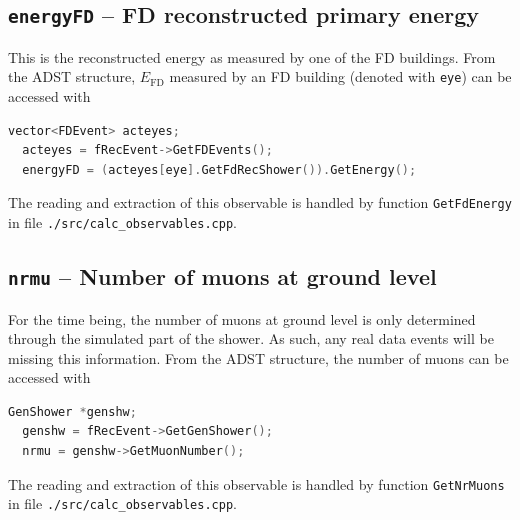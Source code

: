 \documentclass[12pt,a4paper]{report}
\begin{document}
\subsection{\texttt{energyFD} -- FD reconstructed primary energy}
This is the reconstructed energy as measured by one of the FD buildings. From the ADST structure, $E_{\textrm{FD}}$ measured by an FD building (denoted with \texttt{eye}) can be accessed with
\begin{lstlisting}[language=C++]
  vector<FDEvent> acteyes;
  acteyes = fRecEvent->GetFDEvents();
  energyFD = (acteyes[eye].GetFdRecShower()).GetEnergy();
\end{lstlisting}
The reading and extraction of this observable is handled by function \texttt{GetFdEnergy} in file \texttt{./src/calc\_observables.cpp}.

\subsection{\texttt{nrmu} -- Number of muons at ground level}
For the time being, the number of muons at ground level is only determined through the simulated part of the shower. As such, any real data events will be missing this information. From the ADST structure, the number of muons can be accessed with
\begin{lstlisting}[language=C++]
  GenShower *genshw;
  genshw = fRecEvent->GetGenShower();
  nrmu = genshw->GetMuonNumber();
\end{lstlisting}
The reading and extraction of this observable is handled by function \texttt{GetNrMuons} in file \texttt{./src/calc\_observables.cpp}.
\end{document}
